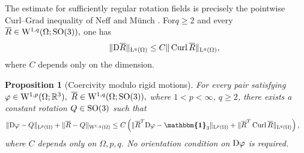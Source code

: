 \documentclass[11pt]{article}
\newcommand{\id}{{\boldsymbol{\mathbbm{1}}}}
\newtheorem{proposition}[theorem]{Proposition}
\begin{document}
The estimate for sufficiently regular rotation fields is precisely the pointwise Curl--Grad inequality of Neff and M\"unch \cite{Neff_curl06}. For$q\geq 2$ and every $\overline R\in {\rm W}^{1,q}(\Omega;{\rm SO}(3)),
$ one has
\begin{align}
\qquad
\|{\rm D} \overline R\|_{{\rm L}^q(\Omega)}
\leq
C\|\operatorname{Curl}\overline R\|_{{\rm L}^q(\Omega)},
\end{align}
where $C$ depends only on the dimension.

\begin{proposition}[Coercivity modulo rigid motions]
\label{prop:lifted-cosserat-coercivity}
For every pair satisfying
$
\varphi\in {\rm W}^{1,p}(\Omega;\mathbb R^3),
$ $
\overline R\in  {\rm W}^{1,q}(\Omega;{\rm SO}(3)) ,
$
where $1<p<\infty$, $q\geq 2$, 
there exists a constant rotation $ Q \in {\rm SO}(3)$ such that
\begin{align}
\label{eq:lifted-cosserat-coercivity}
&\|{\rm D}\varphi- Q \|_{{\rm L}^p(\Omega)}
+
\|\overline R- Q \|_{{\rm W}^{1,q}(\Omega)}
\leq
C\left(
\|\overline R^T{\rm D}\varphi-\id_3\|_{{\rm L}^p(\Omega)}
+
\|\overline R^T\operatorname{Curl}\overline R\|_{{\rm L}^q(\Omega)}
\right),
\end{align}
where $C$ depends only on $\Omega,p,q$. No orientation condition on ${\rm D}\varphi$ is required.
\end{proposition}
\end{document}

